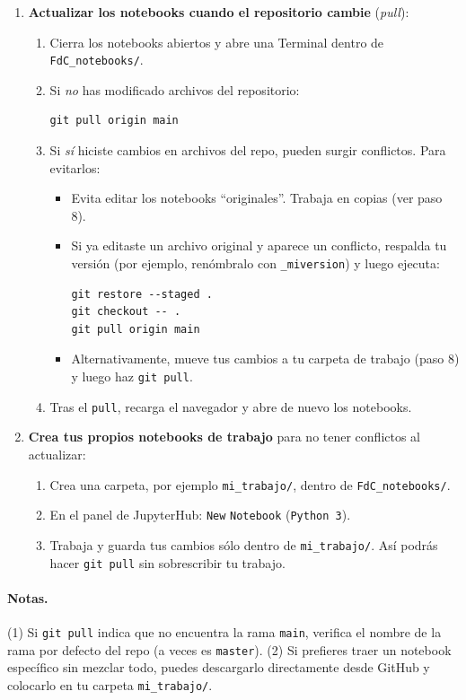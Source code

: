 \documentclass[11pt]{article}
\begin{document}
\begin{enumerate}
  \item \textbf{Actualizar los notebooks cuando el repositorio cambie} (\emph{pull}):
  \begin{enumerate}[label*=\alph*)]
    \item Cierra los notebooks abiertos y abre una Terminal dentro de \texttt{FdC\_notebooks/}.
    \item Si \emph{no} has modificado archivos del repositorio:
\begin{verbatim}
git pull origin main
\end{verbatim}
    \item Si \emph{sí} hiciste cambios en archivos del repo, pueden surgir conflictos. Para evitarlos:
      \begin{itemize}
        \item Evita editar los notebooks “originales”. Trabaja en copias (ver paso 8).
        \item Si ya editaste un archivo original y aparece un conflicto, respalda tu versión (por ejemplo, renómbralo con \texttt{\_miversion}) y luego ejecuta:
\begin{verbatim}
git restore --staged .
git checkout -- .
git pull origin main
\end{verbatim}
        \item Alternativamente, mueve tus cambios a tu carpeta de trabajo (paso 8) y luego haz \texttt{git pull}.
      \end{itemize}
    \item Tras el \texttt{pull}, recarga el navegador y abre de nuevo los notebooks.
  \end{enumerate}

  \item \textbf{Crea tus propios notebooks de trabajo} para no tener conflictos al actualizar:
  \begin{enumerate}[label*=\alph*)]
    \item Crea una carpeta, por ejemplo \texttt{mi\_trabajo/}, dentro de \texttt{FdC\_notebooks/}.
    \item En el panel de JupyterHub: \texttt{New} \textrightarrow{} \texttt{Notebook} (\texttt{Python 3}).
    \item Trabaja y guarda tus cambios sólo dentro de \texttt{mi\_trabajo/}. Así podrás hacer \texttt{git pull} sin sobrescribir tu trabajo.
  \end{enumerate}
\end{enumerate}

\paragraph{Notas.}
(1) Si \texttt{git pull} indica que no encuentra la rama \texttt{main}, verifica el nombre de la rama por defecto del repo (a veces es \texttt{master}). (2) Si prefieres traer un notebook específico sin mezclar todo, puedes descargarlo directamente desde GitHub y colocarlo en tu carpeta \texttt{mi\_trabajo/}.
\end{document}
